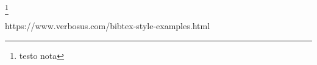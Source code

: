 
\usepackage{hyperref}


\footnote{testo nota}


https://www.verbosus.com/bibtex-style-examples.html
